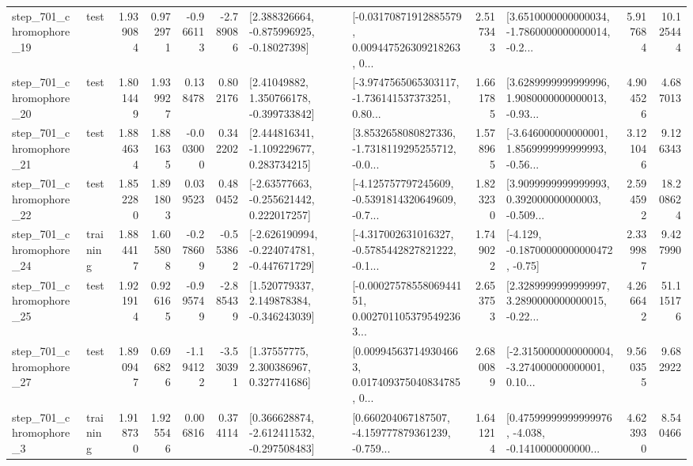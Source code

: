 \begin{tabular}{llrrrrllrlrr}
  step\_701\_chromophore\_19 &      test &      1.939084 &    0.972971 &     -0.966113 & -2.789086 &    [2.388326664, -0.875996925, -0.18027398] &  [-0.03170871912885579, 0.009447526309218263, 0... &       2.517343 &  [3.6510000000000034, -1.7860000000000014, -0.2... &            5.917684 &         10.125444 \\
  step\_701\_chromophore\_20 &      test &      1.801449 &    1.939927 &      0.138478 &  0.802176 &     [2.41049882, 1.350766178, -0.399733842] &  [-3.9747565065303117, -1.736141537373251, 0.80... &       1.661785 &  [3.6289999999999996, 1.9080000000000013, -0.93... &            4.904526 &          4.687013 \\
  step\_701\_chromophore\_21 &      test &      1.884634 &    1.881635 &     -0.003000 &  0.342202 &    [2.444816341, -1.109229677, 0.283734215] &  [3.8532658080827336, -1.7318119295255712, -0.0... &       1.578965 &  [-3.646000000000001, 1.8569999999999993, -0.56... &            3.121046 &          9.126343 \\
  step\_701\_chromophore\_22 &      test &      1.852280 &    1.891803 &      0.039523 &  0.480452 &    [-2.63577663, -0.255621442, 0.222017257] &  [-4.125757797245609, -0.5391814320649609, -0.7... &       1.823230 &  [3.9099999999999993, 0.392000000000003, -0.509... &            2.594592 &         18.208624 \\
  step\_701\_chromophore\_24 &  training &      1.884417 &    1.605808 &     -0.278609 & -0.553862 &  [-2.626190994, -0.224074781, -0.447671729] &  [-4.317002631016327, -0.5785442827821222, -0.1... &       1.749022 &              [-4.129, -0.18700000000000472, -0.75] &            2.339987 &          9.427990 \\
  step\_701\_chromophore\_25 &      test &      1.921914 &    0.926165 &     -0.995749 & -2.885439 &    [1.520779337, 2.149878384, -0.346243039] &  [-0.0002757855806944151, 0.0027011053795492363... &       2.653753 &  [2.3289999999999997, 3.2890000000000015, -0.22... &            4.266642 &         51.115176 \\
  step\_701\_chromophore\_27 &      test &      1.890947 &    0.696826 &     -1.194122 & -3.530391 &      [1.37557775, 2.300386967, 0.327741686] &  [0.009945637149304663, 0.017409375040834785, 0... &       2.680089 &  [-2.3150000000000004, -3.274000000000001, 0.10... &            9.560355 &          9.682922 \\
   step\_701\_chromophore\_3 &  training &      1.918730 &    1.925546 &      0.006816 &  0.374114 &   [0.366628874, -2.612411532, -0.297508483] &  [0.660204067187507, -4.159777879361239, -0.759... &       1.641214 &  [0.47599999999999976, -4.038, -0.1410000000000... &            4.623930 &          8.540466 \\

\end{tabular}

